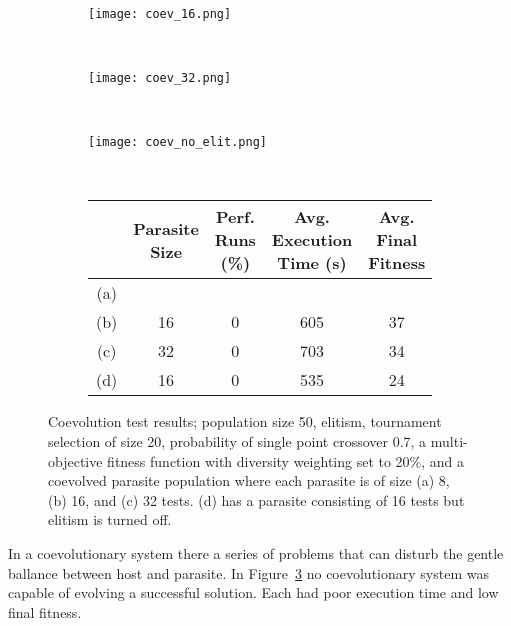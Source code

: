 \begin{figure}
	\centering
	\begin{subfigure}[ht]{0.49\textwidth}
		\caption{}
		\vspace{1em}
	\end{subfigure}
	~
	\begin{subfigure}[ht]{0.49\textwidth}
		\texttt{[image: coev\_16.png]}
		\caption{}
		\label{fig:coev_16}
		\vspace{1em}
	\end{subfigure}
	~
	\begin{subfigure}[ht]{0.49\textwidth}
		\texttt{[image: coev\_32.png]}
		\caption{}
		\vspace{1em}
	\end{subfigure}
	~
	\begin{subfigure}[ht]{0.49\textwidth}
		\texttt{[image: coev\_no\_elit.png]}
		\caption{}
		\label{fig:coev_16_no_elit}
		\vspace{1em}
	\end{subfigure}
	~
	\begin{subfigure}[ht]{\textwidth}
		\centering
		\begin{tabular}{ccccc}
			\toprule
			& \bfseries{Parasite Size} &
			\bfseries{Perf. Runs (\%)} &
			\bfseries{Avg. Execution Time (s)} & \bfseries{Avg. Final Fitness}\\
			\midrule
			(a) & & & & \\
			(b) & 16 & 0 & 605 & 37 \\
			(c) & 32 & 0 & 703 & 34 \\
			(d) & 16 & 0 & 535 & 24 \\
			\bottomrule
		\end{tabular}
	\end{subfigure}

	\caption[Coevolution test results]{Coevolution test results;
	population size 50, elitism, tournament selection of size 20, probability
	of single point crossover 0.7, a multi-objective fitness function with
	diversity weighting set to 20\%, and a coevolved parasite population where
	each parasite is of size
	(a) 8, (b) 16, and (c) 32 tests. (d) has a parasite consisting of 16 tests
	but elitism is turned off.}
	\label{fig:coev}
\end{figure}

In a coevolutionary system there a series of problems that can disturb the gentle
ballance between host and parasite.
In Figure~\ref{fig:coev} no coevolutionary system was capable of evolving a successful
solution. Each had poor execution time and low final fitness.

